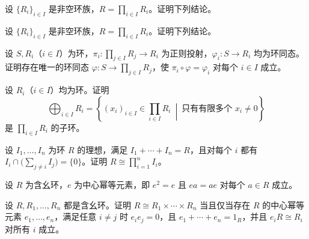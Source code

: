 \noindent\begin{minipage}{\textwidth}
设 $\{R_i\}_{i\in I}$ 是非空环族，$R=\prod_{i\in I}R_i$。证明下列结论。
\end{minipage}\par\vfill
\noindent\begin{minipage}{\textwidth}
设 $\{R_i\}_{i\in I}$ 是非空环族，$R=\prod_{i\in I}R_i$。证明下列结论。
\end{minipage}\par\vfill
\newpage
\noindent\begin{minipage}{\textwidth}
设 $S,R_i$（$i\in I$）为环，$\pi_i\colon\prod_{j\in I}R_j\to R_i$ 为正则投射，$\varphi_i\colon S\to R_i$ 均为环同态。证明存在唯一的环同态 $\varphi\colon S\to\prod_{j\in I}R_j$，使 $\pi_i\circ\varphi=\varphi_i$ 对每个 $i\in I$ 成立。
\end{minipage}\par\vfill
\noindent\begin{minipage}{\textwidth}
设 $R_i$（$i\in I$）均为环。证明
\[
\bigoplus_{i\in I}R_i
=\left\{(x_i)_{i\in I}\in\prod_{i\in I}R_i\ \middle|\ \text{只有有限多个 }x_i\ne0\right\}
\]
是 $\prod_{i\in I}R_i$ 的子环。
\end{minipage}\par\vfill
\noindent\begin{minipage}{\textwidth}
设 $I_1,\dots,I_n$ 为环 $R$ 的理想，满足 $I_1+\cdots+I_n=R$，且对每个 $i$ 都有 $I_i\cap \bigl(\sum_{j\ne i} I_j\bigr)=\{0\}$。证明 $R\cong\prod_{i=1}^{n}I_i$。
\end{minipage}\par\vfill
\newpage
\noindent\begin{minipage}{\textwidth}
设 $R$ 为含幺环，$e$ 为中心幂等元素，即 $e^2=e$ 且 $ea=ae$ 对每个 $a\in R$ 成立。
\end{minipage}\par\vfill
\noindent\begin{minipage}{\textwidth}
设 $R,R_1,\dots,R_n$ 都是含幺环。证明 $R\cong R_1\times\cdots\times R_n$ 当且仅当存在 $R$ 的中心幂等元素 $e_1,\dots,e_n$，满足任意 $i\ne j$ 时 $e_ie_j=0$，且 $e_1+\cdots+e_n=1_R$，并且 $e_iR\cong R_i$ 对所有 $i$ 成立。
\end{minipage}\par\vfill
